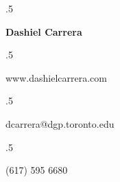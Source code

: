 \documentclass[margin, 10pt]{res} %
\begin{document}

\moveleft.5\hoffset\centerline{\huge\bf Dashiel Carrera} %
 
  \moveleft.5\hoffset\centerline{\footnotesize www.dashielcarrera.com}
 \moveleft.5\hoffset\centerline{\footnotesize dcarrera@dgp.toronto.edu}
\moveleft.5\hoffset\centerline{\footnotesize (617) 595 6680}


\begin{resume}






\end{resume}
\end{document}
